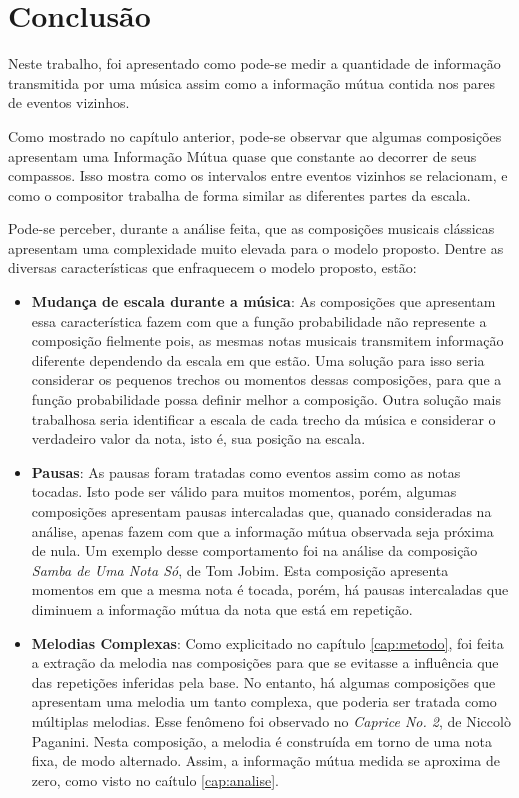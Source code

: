 \section{Conclusão}

Neste trabalho, foi apresentado como pode-se medir a quantidade de informação transmitida por uma música assim como a informação mútua contida nos pares de eventos vizinhos.

Como mostrado no capítulo anterior, pode-se observar que algumas composições apresentam uma Informação Mútua quase que constante ao decorrer de seus compassos. Isso mostra como os intervalos entre eventos vizinhos se relacionam, e como o compositor trabalha de forma similar as diferentes partes da escala.

Pode-se perceber, durante a análise feita, que as composições musicais clássicas apresentam uma complexidade muito elevada para o modelo proposto. Dentre as diversas características que enfraquecem o modelo proposto, estão:

\begin{itemize}
    \item \textbf{Mudança de escala durante a música}: As composições que apresentam essa característica fazem com que a função probabilidade não represente a composição fielmente pois, as mesmas notas musicais transmitem informação diferente dependendo da escala em que estão. Uma solução para isso seria considerar os pequenos trechos ou momentos dessas composições, para que a função probabilidade possa definir melhor a composição. Outra solução mais trabalhosa seria identificar a escala de cada trecho da música e considerar o verdadeiro valor da nota, isto é, sua posição na escala.
    \item \textbf{Pausas}: As pausas foram tratadas como eventos assim como as notas tocadas. Isto pode ser válido para muitos momentos, porém, algumas composições apresentam pausas intercaladas que, quanado consideradas na análise, apenas fazem com que a informação mútua observada seja próxima de nula. Um exemplo desse comportamento foi na análise da composição \textit{Samba de Uma Nota Só}, de Tom Jobim. Esta composição apresenta momentos em que a mesma nota é tocada, porém, há pausas intercaladas que diminuem a informação mútua da nota que está em repetição.
    \item \textbf{Melodias Complexas}: Como explicitado no capítulo \ref{cap:metodo}, foi feita a extração da melodia nas composições para que se evitasse a influência que das repetições inferidas pela base. No entanto, há algumas composições que apresentam uma melodia um tanto complexa, que poderia ser tratada como múltiplas melodias. Esse fenômeno foi observado no \textit{Caprice No. 2}, de Niccolò Paganini. Nesta composição, a melodia é construída em torno de uma nota fixa, de modo alternado. Assim, a informação mútua medida se aproxima de zero, como visto no caítulo \ref{cap:analise}.
\end{itemize}

